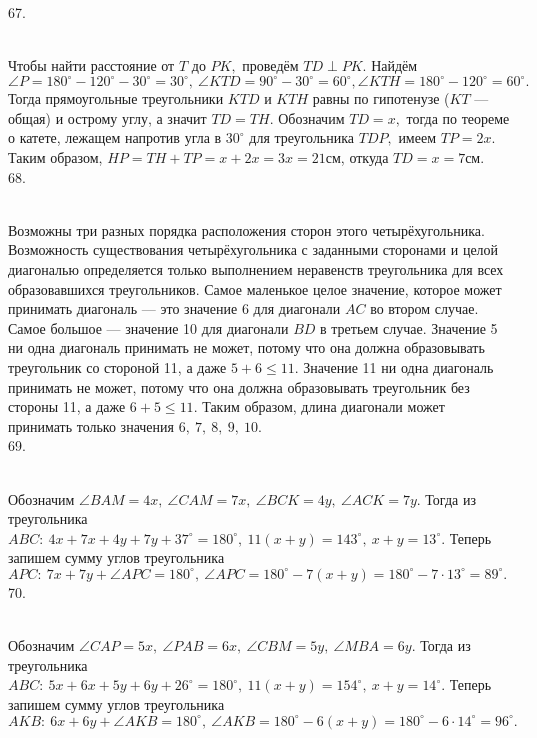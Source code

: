 67. \begin{figure}[ht!]
\end{figure}\\
Чтобы найти расстояние от $T$ до $PK,$ проведём $TD\perp PK.$ Найдём $\angle P=180^\circ-120^\circ-30^\circ=30^\circ,\ \angle KTD=90^\circ-30^\circ=60^\circ, \angle KTH=180^\circ-120^\circ=60^\circ.$ Тогда прямоугольные треугольники $KTD$ и $KTH$ равны по гипотенузе ($KT$ --- общая) и острому углу, а значит $TD=TH.$ Обозначим $TD=x,$ тогда по теореме о катете, лежащем напротив угла в $30^\circ$ для треугольника $TDP,$ имеем $TP=2x.$ Таким образом, $HP=TH+TP=x+2x=3x=21$см, откуда $TD=x=7$см.\\
68. \begin{figure}[ht!]
\end{figure}\\
Возможны три разных порядка расположения сторон этого четырёхугольника. Возможность существования четырёхугольника с заданными сторонами и целой диагональю определяется только выполнением неравенств треугольника для всех образовавшихся треугольников. Самое маленькое целое значение, которое может принимать диагональ --- это значение 6 для диагонали $AC$ во втором случае. Самое большое --- значение 10 для диагонали $BD$ в третьем случае. Значение 5 ни одна диагональ принимать не может, потому что она должна образовывать треугольник со стороной 11, а даже $5+6\leqslant11.$ Значение 11 ни одна диагональ принимать не может, потому что она должна образовывать треугольник без стороны 11, а даже $6+5\leqslant11.$ Таким образом, длина диагонали может принимать только значения $6,\ 7,\ 8,\ 9,\ 10.$\\
69. \begin{figure}[ht!]
\end{figure}\\
Обозначим $\angle BAM=4x,\ \angle CAM=7x,\ \angle BCK=4y,\ \angle ACK=7y.$ Тогда из треугольника $ABC:\ 4x+7x+4y+7y+37^\circ=180^\circ,\ 11(x+y)=143^\circ,\ x+y=13^\circ.$ Теперь запишем сумму углов треугольника $APC:\ 7x+7y+\angle APC=180^\circ,\ \angle APC=180^\circ-7(x+y)=180^\circ-7\cdot13^\circ=89^\circ.$\\
70. \begin{figure}[ht!]
\end{figure}\\
Обозначим $\angle CAP=5x,\ \angle PAB=6x,\ \angle CBM=5y,\ \angle MBA=6y.$ Тогда из треугольника $ABC:\ 5x+6x+5y+6y+26^\circ=180^\circ,\ 11(x+y)=154^\circ,\ x+y=14^\circ.$ Теперь запишем сумму углов треугольника $AKB:\ 6x+6y+\angle AKB=180^\circ,\ \angle AKB=180^\circ-6(x+y)=180^\circ-6\cdot14^\circ=96^\circ.$\\
